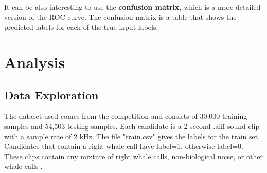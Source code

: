 \documentclass[]{article}
\begin{document}
It can be also interesting to use the \textbf{confusion matrix}, which is a more detailed version of the ROC curve. The confusion matrix is a table that shows the predicted labels for each of the true input labels.

\section{Analysis}\label{ii.-analysis}

\subsection{Data Exploration}\label{data-exploration}

The dataset used comes from the competition and consists of 30,000 training samples and 54,503 testing samples. Each candidate is a 2-second .aiff sound clip with a sample rate of 2 kHz. The file "train.csv" gives the labels for the train set. Candidates that contain a right whale call have label=1, otherwise label=0. These clips contain any mixture of right whale calls, non-biological noise, or other whale calls \cite{CornellWeb, CornellWeb2}. 
\end{document}
